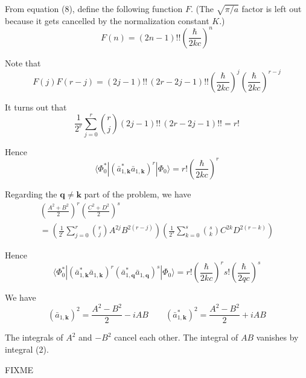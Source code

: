 From equation (8), define the following function $F$.
(The $\sqrt{\pi/a}$ factor is left out because it gets cancelled by the normalization constant $K$.)
\begin{equation*}
F(n)=(2n-1)!!\left(\frac{\hbar}{2kc}\right)^n
\end{equation*}

Note that
\begin{equation*}
F(j)F(r-j)=
(2j-1)!!\,(2r-2j-1)!!
\left(\frac{\hbar}{2kc}\right)^j
\left(\frac{\hbar}{2kc}\right)^{r-j}
\end{equation*}

It turns out that
\begin{equation*}
\frac{1}{2^r}\sum_{j=0}^r\binom{r}{j}(2j-1)!!\,(2r-2j-1)!!=r!
\end{equation*}

Hence
\begin{equation*}
\langle\Phi_0^*|(\bar a_{1,\mathbf k}^*\bar a_{1,\mathbf k})^r|\Phi_0\rangle
=r!\left(\frac{\hbar}{2kc}\right)^r
\end{equation*}

Regarding the $\mathbf q\ne\mathbf k$ part of the problem, we have
\begin{multline*}
\left(\frac{A^2+B^2}{2}\right)^r\left(\frac{C^2+D^2}{2}\right)^s
\\
{}=
\left(\frac{1}{2^r}\sum_{j=0}^r\binom{r}{j}A^{2j}B^{2(r-j)}\right)
\left(\frac{1}{2^s}\sum_{k=0}^s\binom{s}{k}C^{2k}D^{2(r-k)}\right)
\end{multline*}

Hence
\begin{equation*}
\langle\Phi_0^*|
(\bar a_{1,\mathbf k}^*\bar a_{1,\mathbf k})^r
(\bar a_{1,\mathbf q}^*\bar a_{1,\mathbf q})^s
|\Phi_0\rangle
=r!\left(\frac{\hbar}{2kc}\right)^r
s!\left(\frac{\hbar}{2qc}\right)^s
\end{equation*}


We have
\begin{equation*}
(\bar a_{1,\mathbf k})^2=\frac{A^2-B^2}{2}-iAB
\qquad
(\bar a_{1,\mathbf k}^*)^2=\frac{A^2-B^2}{2}+iAB
\end{equation*}

The integrals of $A^2$ and $-B^2$ cancel each other.
The integral of $AB$ vanishes by integral (2).

\bigskip
{}

FIXME


